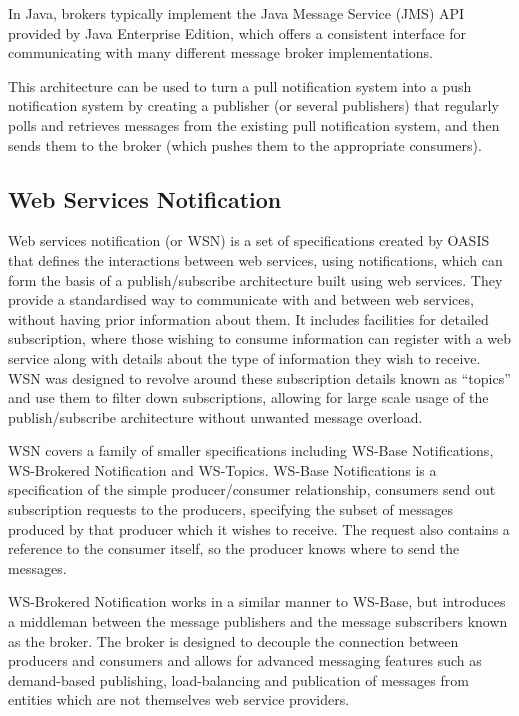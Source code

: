 \documentclass[a4paper, 12pt, twoside]{article}
\begin{document}
In Java, brokers typically implement the Java Message Service (JMS) API provided by Java Enterprise Edition\cite{hapner2002java}, which offers a consistent interface for communicating with many different message broker implementations.

This architecture can be used to turn a pull notification system into a push notification system by creating a publisher (or several publishers) that regularly polls and retrieves messages from the existing pull notification system, and then sends them to the broker (which pushes them to the appropriate consumers).

\subsection{Web Services Notification}
\label{sec:bg_wsn}

Web services notification (or WSN) is a set of specifications created by OASIS\cite{oasisWSN} that defines the interactions between web services, using notifications, which can form the basis of a publish/subscribe architecture built using web services. They provide a standardised way to communicate with and between web services, without having prior information about them. It includes facilities for detailed subscription, where those wishing to consume information can register with a web service along with details about the type of information they wish to receive. WSN was designed to revolve around these subscription details known as ``topics'' and use them to filter down subscriptions, allowing for large scale usage of the publish/subscribe architecture without unwanted message overload.

WSN covers a family of smaller specifications including WS-Base Notifications, WS-Brokered Notification and WS-Topics. WS-Base Notifications is a specification of the simple producer/consumer relationship, consumers send out subscription requests to the producers, specifying the subset of messages produced by that producer which it wishes to receive. The request also contains a reference to the consumer itself, so the producer knows where to send the messages.

WS-Brokered Notification works in a similar manner to WS-Base, but introduces a middleman between the message publishers and the message subscribers known as the broker. The broker is designed to decouple the connection between producers and consumers and allows for advanced messaging features such as demand-based publishing, load-balancing and publication of messages from entities which are not themselves web service providers.
\end{document}

